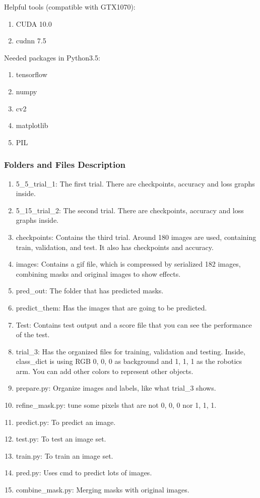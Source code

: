 \documentclass[10pt,journal,compsoc, draftclsnofoot,onecolumn]{IEEEtran}
\begin{document}
\noindent
Helpful tools (compatible with GTX1070):
\begin{enumerate}
\item CUDA 10.0
\item cudnn 7.5
\end{enumerate}
\noindent
Needed packages in Python3.5:
\begin{enumerate}
\item tensorflow
\item numpy
\item cv2
\item matplotlib
\item PIL
\end{enumerate}

\subsubsection{Folders and Files Description}
\begin{enumerate}
\item 5\_5\_trial\_1: The first trial. There are checkpoints, accuracy and loss graphs inside.
\item 5\_15\_trial\_2: The second trial. There are checkpoints, accuracy and loss graphs inside.
\item checkpoints: Contains the third trial. Around 180 images are used, containing train, validation, and test. It also has checkpoints and accuracy.
\item images: Contains a gif file, which is compressed by serialized 182 images, combining masks and original images to show effects.
\item pred\_out: The folder that has predicted masks.
\item predict\_them: Has the images that are going to be predicted.
\item Test: Contains test output and a score file that you can see the performance of the test.
\item trial\_3: Has the organized files for training, validation and testing. Inside, class\_dict is using RGB 0, 0, 0 as background and 1, 1, 1 as the robotics arm. You can add other colors to represent other objects.
\item prepare.py: Organize images and labels, like what trial\_3 shows.
\item refine\_mask.py: tune some pixels that are not 0, 0, 0 nor 1, 1, 1.
\item predict.py: To predict an image.
\item test.py: To test an image set.
\item train.py: To train an image set.
\item pred.py: Uses cmd to predict lots of images.
\item combine\_mask.py: Merging masks with original images.
\end{enumerate}
\end{document}

